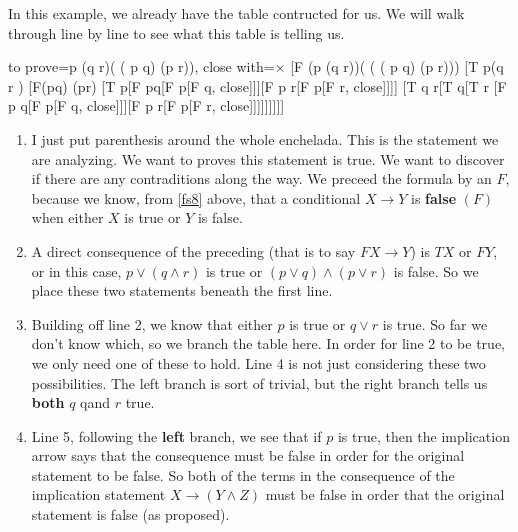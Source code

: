 \newpage

\begin{example}  In this example, we already have the table contructed for us.  We will walk through line by line to see what this table is telling us.

\begin{minipage}{0.35\textwidth}
\begin{tableau}
{
to prove={p \lor (q \land r)\rightarrow \left( ( p \lor q) \land (p \lor r)\right)},
close with=\ensuremath{\times}
}
[F (p \lor (q \land r))\rightarrow( \left( ( p \lor q) \land (p \lor r)\right))
[T p\lor(q \land r )
[F(p\lor q) \land (p\lor r)
[T p[F p\lor q[F p[F q, close]]][F p \lor r[F p[F r, close]]]]
[T q \land r[T q[T r [F p \lor q[F p[F q, close]]][F p \lor r[F p[F r, close]]]]]]]]]
\end{tableau}
\end{minipage}
\begin{minipage}{0.65\textwidth}
\ifKey 
\hfill\color{red}  \begin{enumerate}
\item I just put parenthesis around the whole enchelada.  This is the statement we are analyzing.   We want to proves this statement is true.  We want to discover if there are any contraditions along the way.  We preceed the formula by an $F$, because we know, from \ref{fs8} above, that a conditional $X\rightarrow Y$ is \textbf{false} $(F)$ when either $X$ is true or $Y$ is false.
\item A direct consequence of the preceding (that is to say $FX\rightarrow Y$) is $TX$ or $FY$, or in this case, $p\lor(q \land r )$ is true or $(p\lor q) \land (p\lor r)$ is false.  So we place these two statements beneath the first line.
\item Building off line 2, we know that either $p$ is true or $q\lor r$ is true.  So far we don't know which, so we branch the table here. In order for line 2 to be true, we only need one of these to hold. Line 4 is not just considering these two possibilities.  The left branch is sort of trivial, but the right branch tells us \textbf{both} $q$ qand $r$ true.
\item Line 5, following the \textbf{left} branch, we see that if $p$ is true, then the implication arrow says that the consequence must be false in order for the original statement to be false.  So both of the terms in the consequence of the implication statement $X\rightarrow (Y\land Z)$ must be false in order that the original statement is false (as proposed).

\end{enumerate}
\end{minipage}
\end{example}
